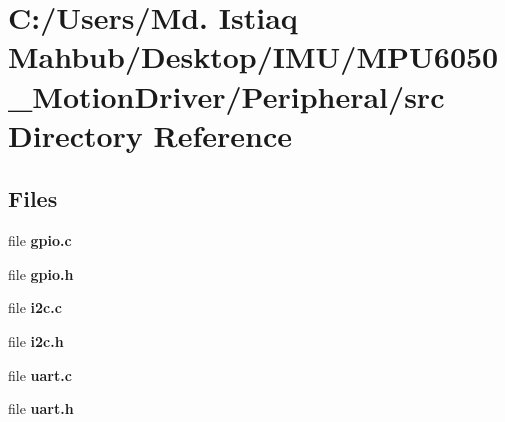 \section{C\+:/\+Users/\+Md. Istiaq Mahbub/\+Desktop/\+I\+M\+U/\+M\+P\+U6050\+\_\+\+Motion\+Driver/\+Peripheral/src Directory Reference}
\label{dir_f079f0da8f0c72cf0675874d889fe21a}
\subsection*{Files}
\begin{DoxyCompactItemize}
\item 
file \textbf{ gpio.\+c}
\item 
file \textbf{ gpio.\+h}
\item 
file \textbf{ i2c.\+c}
\item 
file \textbf{ i2c.\+h}
\item 
file \textbf{ uart.\+c}
\item 
file \textbf{ uart.\+h}
\end{DoxyCompactItemize}
